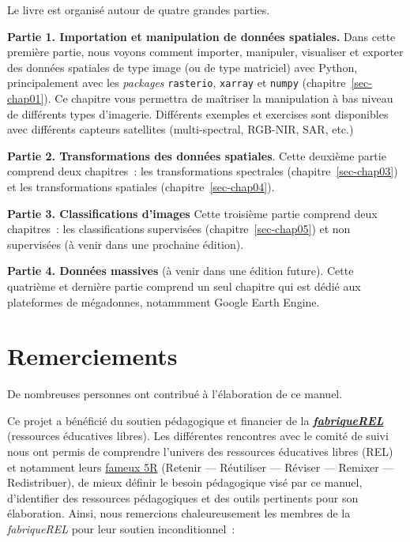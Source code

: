 \documentclass[
  11pt,
  letterpaper,
  open=any,
  twoside=false,
  french]{scrbook}
\begin{document}

Le livre est organisé autour de quatre grandes parties.

\textbf{Partie 1. Importation et manipulation de données spatiales.}
Dans cette première partie, nous voyons comment importer, manipuler,
visualiser et exporter des données spatiales de type image (ou de type
matriciel) avec Python, principalement avec les \emph{packages}
\texttt{rasterio}, \texttt{xarray} et \texttt{numpy}
(chapitre~\ref{sec-chap01}). Ce chapitre vous permettra de maîtriser la
manipulation à bas niveau de différents types d'imagerie. Différents
exemples et exercises sont disponibles avec différents capteurs
satellites (multi-spectral, RGB-NIR, SAR, etc.)

\textbf{Partie 2. Transformations des données spatiales}. Cette deuxième
partie comprend deux chapitres~: les transformations spectrales
(chapitre~\ref{sec-chap03}) et les transformations spatiales
(chapitre~\ref{sec-chap04}).

\textbf{Partie 3. Classifications d'images} Cette troisième partie
comprend deux chapitres~: les classifications supervisées
(chapitre~\ref{sec-chap05}) et non supervisées (à venir dans une
prochaine édition).

\textbf{Partie 4. Données massives} (à venir dans une édition future).
Cette quatrième et dernière partie comprend un seul chapitre qui est
dédié aux plateformes de mégadonnes, notammment Google Earth Engine.

\section*{Remerciements}\label{sect005}


De nombreuses personnes ont contribué à l'élaboration de ce manuel.

Ce projet a bénéficié du soutien pédagogique et financier de la
\href{https://fabriquerel.org/}{\textbf{\emph{fabriqueREL}}} (ressources
éducatives libres). Les différentes rencontres avec le comité de suivi
nous ont permis de comprendre l'univers des ressources éducatives libres
(REL) et notamment leurs \href{https://fabriquerel.org/rel/}{fameux 5R}
(Retenir --- Réutiliser --- Réviser --- Remixer --- Redistribuer), de
mieux définir le besoin pédagogique visé par ce manuel, d'identifier des
ressources pédagogiques et des outils pertinents pour son élaboration.
Ainsi, nous remercions chaleureusement les membres de la
\emph{fabriqueREL} pour leur soutien inconditionnel~:
\end{document}
